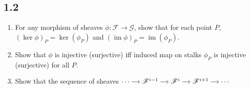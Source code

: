 {}
\subsection*{1.2}
\label{subsec:II.1.2}


\begin{enumerate}
    \item For any morphism of sheaves $\phi: \mathscr{F}\to\mathscr{G}$, show that for each point $P$, $(\ker \phi )_{P}=\ker(\phi_{P})$ and $(\operatorname{im}\phi)_{P} = \operatorname{im}(\phi_{P})$.
    \item Show that $\phi$ is injective (surjective) iff induced map on stalks $\phi_{P}$ is injective (surjective) for all $P$.
    \item Show that the sequence of sheaves $\begin{tikzcd}[cramped, sep=small] \cdots \arrow[r] & \mathscr{F}^{i-1} \arrow[r] & \mathscr{F}^{i} \arrow[r] & \mathscr{F}^{i+1} \arrow[r] & \cdots \end{tikzcd}$

\end{enumerate}